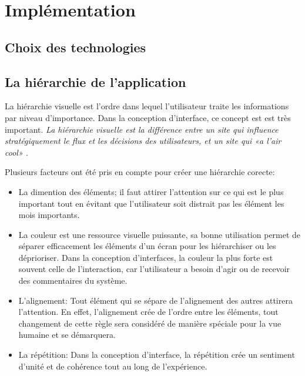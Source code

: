 \chapter{Implémentation}
        \section{Choix des technologies}
                
        \section{La hiérarchie de l'application}
                
        La hiérarchie visuelle est l'ordre dans lequel l'utilisateur traite les informations par niveau d'importance.
        Dans la conception d'interface, ce concept est est très important.
        \textit{La hiérarchie visuelle est la différence entre un site qui influence stratégiquement le flux et les 
        décisions des utilisateurs, et un site qui «a l'air cool» \cite{cao20155}.}
        \par 
        Plusieurs facteurs ont été pris en compte pour créer une hiérarchie corecte:
        \begin{itemize}
                \item La dimention des éléments; il faut attirer l'attention sur ce qui est le plus important
                tout en évitant que l'utilisateur soit distrait pas les élément les mois importants.
                \item La couleur est une ressource visuelle puissante, sa bonne utilisation permet de séparer 
                efficacement les éléments d'un écran pour les hiérarchiser ou les déprioriser. Dans la 
                conception d’interfaces, la couleur la plus forte est souvent celle de l’interaction, 
                car l’utilisateur a besoin d’agir ou de recevoir des commentaires du système.
                \item L'alignement: Tout élément qui se sépare de l'alignement des autres attirera l'attention. 
                En effet, l'alignement crée de l'ordre entre les éléments, tout changement de cette règle sera 
                considéré de manière spéciale pour la vue humaine et se démarquera.
                \item La répétition: Dans la conception d'interface, la répétition crée un sentiment 
                d'unité et de cohérence tout au long de l'expérience.

        \end{itemize}
